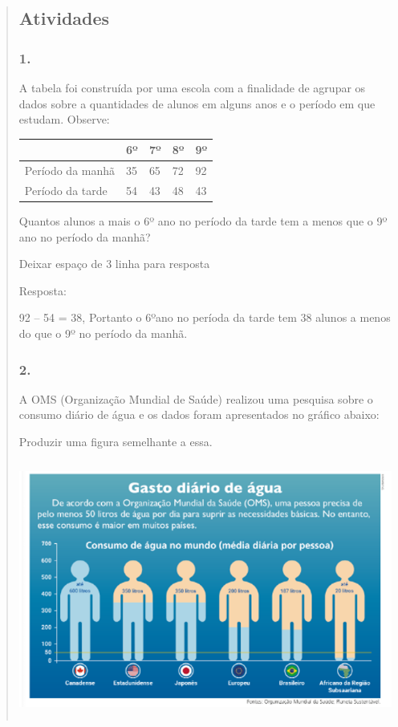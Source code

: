 \begin{enumerate}
\begin{escolha}
\begin{enumerate}
\begin{itemize}
\begin{itemize}
\begin{escolha}
\begin{quote}
\begin{escolha}
{\subsection{Atividades}\label{atividades-7}

\subsubsection{1.}\label{section-91}

A tabela foi construída por uma escola com a finalidade de agrupar os
dados sobre a quantidades de alunos em alguns anos e o período em que
estudam. Observe:

\begin{longtable}[]{@{}lllll@{}}
\toprule
& 6º & 7º & 8º & 9º\tabularnewline
\midrule
\endhead
Período da manhã & 35 & 65 & 72 & 92\tabularnewline
Período da tarde & 54 & 43 & 48 & 43\tabularnewline
\bottomrule
\end{longtable}

Quantos alunos a mais o 6º ano no período da tarde tem a menos que o 9º
ano no período da manhã?

Deixar espaço de 3 linha para resposta

Resposta:

92 -- 54 = 38, Portanto o 6ºano no períoda da tarde tem 38 alunos a
menos do que o 9º no período da manhã.

\subsubsection{2.}\label{section-92}

A OMS (Organização Mundial de Saúde) realizou uma pesquisa sobre o
consumo diário de água e os dados foram apresentados no gráfico abaixo:

Produzir uma figura semelhante a essa.

\includegraphics[width=5.22545in,height=3.31695in]{media/image95.png}

}
\end{escolha}
\end{quote}
\end{escolha}
\end{itemize}
\end{itemize}
\end{enumerate}
\end{escolha}
\end{enumerate}
